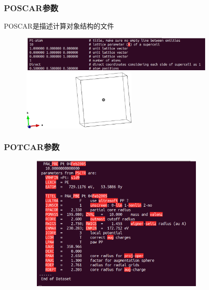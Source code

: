 {
	\frametitle{\textrm{POSCAR}参数}
\textrm{POSCAR}是描述计算对象结构的文件%
\begin{figure}[h!]
\centering
\vskip -3pt
\includegraphics[height=0.70in,width=4.0in,viewport=0 0 850 155,clip]{Figures/Pt_atom-POSCAR.png}
\includegraphics[height=1.2in,width=2.4in,viewport=0 0 680 362,clip]{Figures/Pt_atom-structure.png}
\caption{\fontsize{6.2pt}{5.2pt}}%
\label{Pt_atom:POSCAR}
\end{figure}
{\fontsize{7.2pt}{5.2pt}}
}
\frame
{
	\frametitle{\textrm{POTCAR}参数}
\begin{figure}[h!]
\centering
\includegraphics[height=2.7in,width=4.0in,viewport=0 15 780 528,clip]{Figures/Pt_atom-POTCAR.png}
\caption{\fontsize{6.2pt}{5.2pt}}%
\label{Pt_atom:POTCAR}
\end{figure}
}
